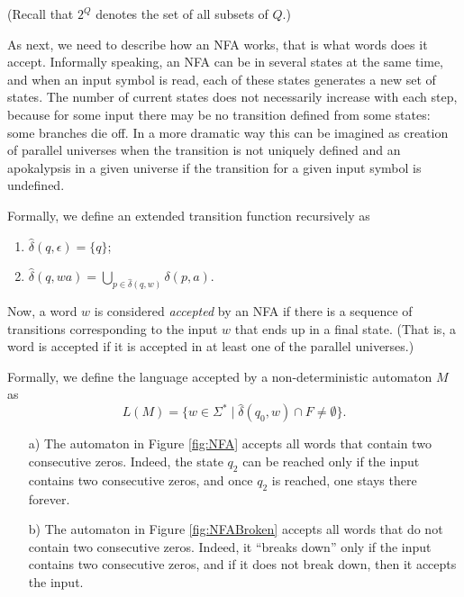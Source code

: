 \begin{page}

(Recall that $2^Q$ denotes the set of all subsets of $Q$.)

As next, we need to describe how an NFA works, that is what words does it accept.
Informally speaking, an NFA can be in several states at the same time, and when an input symbol is read, each of these states generates a new set of states.
The number of current states does not necessarily increase with each step, because for some input there may be no transition defined from some states:
some branches die off.
In a more dramatic way this can be imagined as creation of parallel universes when the transition is not uniquely defined
and an apokalypsis in a given universe if the transition for a given input symbol is undefined.

Formally, we define an extended transition function recursively as
\begin{enumerate}
\item
$\widehat{\delta}(q, \epsilon) = \{q\}$;
\item
$\widehat{\delta}(q, wa) = \bigcup\limits_{p \in \widehat{\delta}(q,w)} \delta(p, a)$.
\end{enumerate}

Now, a word $w$ is considered \emph{accepted} by an NFA if there is a sequence of transitions corresponding to the input $w$
that ends up in a final state.
(That is, a word is accepted if it is accepted in at least one of the parallel universes.)

Formally, we define the language accepted by a non-deterministic automaton $M$ as
\begin{equation}
\label{eqn:NFALanguage}
L(M) = \{w \in \Sigma^* \mid \widehat{\delta}(q_0, w) \cap F \ne \emptyset\}.
\end{equation}


\end{page}

\begin{page}

\begin{exl}
\label{exl:NFA}
\par\noindent
\begin{enumerate}
\item[a)]
The automaton in Figure \ref{fig:NFA} accepts all words that contain two consecutive zeros.
Indeed, the state $q_2$ can be reached only if the input contains two consecutive zeros,
and once $q_2$ is reached, one stays there forever.
\item[b)]
The automaton in Figure \ref{fig:NFABroken} accepts all words that do not contain two consecutive zeros.
Indeed, it ``breaks down'' only if the input contains two consecutive zeros, and if it does not break down, then it accepts the input.
\end{enumerate}
\end{exl}

\end{page}


